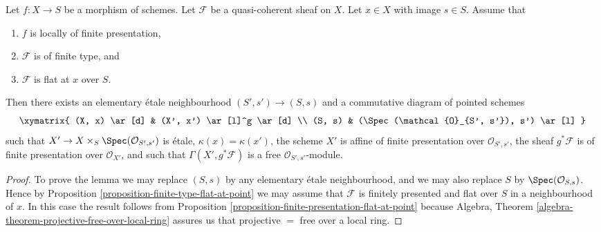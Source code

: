 \begin{lemma}
\label{lemma-finite-type-flat-at-point-free}
Let $f : X \to S$ be a morphism of schemes.
Let $\mathcal{F}$ be a quasi-coherent sheaf on $X$.
Let $x \in X$ with image $s \in S$.
Assume that
\begin{enumerate}
\item $f$ is locally of finite presentation,
\item $\mathcal{F}$ is of finite type, and
\item $\mathcal{F}$ is flat at $x$ over $S$.
\end{enumerate}
Then there exists an elementary \'etale neighbourhood $(S', s') \to (S, s)$
and a commutative diagram of pointed schemes
$$
\xymatrix{
(X, x) \ar[d] & (X', x') \ar[l]^g \ar[d] \\
(S, s) & (\Spec(\mathcal{O}_{S', s'}), s') \ar[l]
}
$$
such that $X' \to X \times_S \Spec(\mathcal{O}_{S', s'})$
is \'etale, $\kappa(x) = \kappa(x')$, the scheme $X'$ is
affine of finite presentation over $\mathcal{O}_{S', s'}$,
the sheaf $g^*\mathcal{F}$ is of finite presentation over $\mathcal{O}_{X'}$,
and such that $\Gamma(X', g^*\mathcal{F})$ is a free
$\mathcal{O}_{S', s'}$-module.
\end{lemma}

\begin{proof}
To prove the lemma we may replace $(S, s)$ by any elementary \'etale
neighbourhood, and we may also replace $S$ by
$\Spec(\mathcal{O}_{S, s})$. Hence by
Proposition \ref{proposition-finite-type-flat-at-point}
we may assume that $\mathcal{F}$ is finitely presented and flat over
$S$ in a neighbourhood of $x$. In this case the result follows from
Proposition \ref{proposition-finite-presentation-flat-at-point}
because
Algebra, Theorem \ref{algebra-theorem-projective-free-over-local-ring}
assures us that projective $=$ free over a local ring.
\end{proof}
